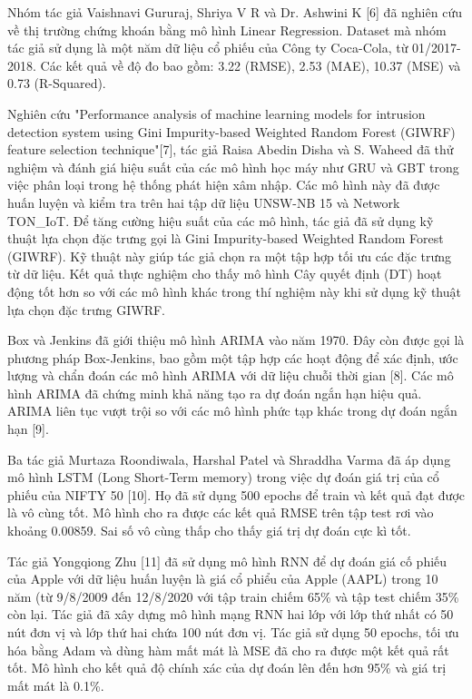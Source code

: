 \documentclass[conference]{IEEEtran}
\begin{document}
Nhóm tác giả Vaishnavi Gururaj, Shriya V R và Dr. Ashwini K [6] đã nghiên cứu về thị trường chứng khoán bằng mô hình Linear Regression. Dataset mà nhóm tác giả sử dụng là một năm dữ liệu cổ phiếu của Công ty Coca-Cola, từ 01/2017-2018. Các kết quả về độ đo bao gồm: 3.22 (RMSE), 2.53 (MAE), 10.37 (MSE) và 0.73 (R-Squared).

Nghiên cứu "Performance analysis of machine learning models for intrusion detection system using Gini Impurity-based Weighted Random Forest (GIWRF) feature selection technique"[7], tác giả Raisa Abedin Disha và S. Waheed đã thử nghiệm và đánh giá hiệu suất của các mô hình học máy như GRU và GBT trong việc phân loại trong hệ thống phát hiện xâm nhập. Các mô hình này đã được huấn luyện và kiểm tra trên hai tập dữ liệu UNSW-NB 15 và Network TON\_IoT. Để tăng cường hiệu suất của các mô hình, tác giả đã sử dụng kỹ thuật lựa chọn đặc trưng gọi là Gini Impurity-based Weighted Random Forest (GIWRF). Kỹ thuật này giúp tác giả chọn ra một tập hợp tối ưu các đặc trưng từ dữ liệu. Kết quả thực nghiệm cho thấy mô hình Cây quyết định (DT) hoạt động tốt hơn so với các mô hình khác trong thí nghiệm này khi sử dụng kỹ thuật lựa chọn đặc trưng GIWRF.

Box và Jenkins đã giới thiệu mô hình ARIMA vào năm 1970. Đây còn được gọi là phương pháp Box-Jenkins, bao gồm một tập hợp các hoạt động để xác định, ước lượng và chẩn đoán các mô hình ARIMA với dữ liệu chuỗi thời gian [8]. Các mô hình ARIMA đã chứng minh khả năng tạo ra dự đoán ngắn hạn hiệu quả. ARIMA liên tục vượt trội so với các mô hình phức tạp khác trong dự đoán ngắn hạn [9].

Ba tác giả Murtaza Roondiwala, Harshal Patel và Shraddha Varma đã áp dụng mô hình LSTM (Long Short-Term memory) trong việc dự đoán giá trị của cổ phiếu của NIFTY 50 [10]. Họ đã sử dụng 500 epochs để train và kết quả đạt được là vô cùng tốt. Mô hình cho ra được các kết quả RMSE trên tập test rơi vào khoảng 0.00859. Sai số vô cùng thấp cho thấy giá trị dự đoán cực kì tốt.

Tác giả Yongqiong Zhu [11] đã sử dụng mô hình RNN để dự đoán giá cố phiếu của Apple với dữ liệu huấn luyện là giá cổ phiểu của Apple (AAPL) trong 10 năm (từ 9/8/2009 đến 12/8/2020 với tập train chiếm 65\% và tập test chiếm 35\% còn lại. Tác giả đã xây dựng mô hình mạng RNN hai lớp với lớp thứ nhất có 50 nút đơn vị và lớp thứ hai chứa 100 nút đơn vị. Tác giả sử dụng 50 epochs, tối ưu hóa bằng Adam và dùng hàm mất mát là MSE đã cho ra được một kết quả rất tốt. Mô hình cho kết quả độ chính xác của dự đoán lên đến hơn 95\% và giá trị mất mát là 0.1\%.
\end{document}
